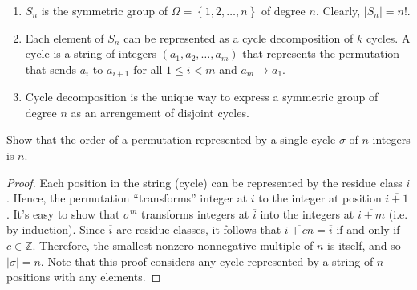 \documentclass[12pt]{article}
\newcommand{\Z}{\mathbb{Z}}
\newenvironment{problem}[2][Problem]{\begin{trivlist} \item[\hskip \labelsep {\bfseries #1}\hskip \labelsep {\bfseries #2.}]}{\end{trivlist}}
\begin{document}
\begin{enumerate}
  \item $S_{n}$ is the symmetric group of $\Omega=\left\{ 1,2,\dots,n \right\}$ of degree $n$. Clearly, $|S_{n}|=n!$.
  \item Each element of $S_{n}$ can be represented as a cycle decomposition of $k$ cycles. A cycle is a string of integers $(a_{1},a_{2},\dots,a_{m})$ that represents the permutation that sends $a_{i}$ to $a_{i+1}$ for all $1\leq i<m$ and $a_{m}\to a_{1}$. \\
  \item Cycle decomposition is the unique way to express a symmetric group of degree $n$ as an arrengement of disjoint cycles.
\end{enumerate}
\begin{problem}{a}
  Show that the order of a permutation represented by a single cycle $\sigma$ of $n$ integers is $n$.
  \begin{proof}
    Each position in the string (cycle) can be represented by the residue class $\overline{i}$. Hence, the permutation ``transforms''  integer at $\overline{i}$ to the integer at position $\overline{i+1}$. It's easy to show that $\sigma^{m}$ transforms integers at $\overline{i}$ into the integers at $\overline{i+m}$ (i.e. by induction). Since $\overline{i}$ are residue classes, it follows that $\overline{i+cn} = \overline{i}$ if and only if $c\in \Z$. Therefore, the smallest nonzero nonnegative multiple of $n$ is itself, and so $|\sigma|=n$. Note that this proof considers any cycle represented by a string of $n$ positions with any elements.
  \end{proof}
\end{problem}
\end{document}
